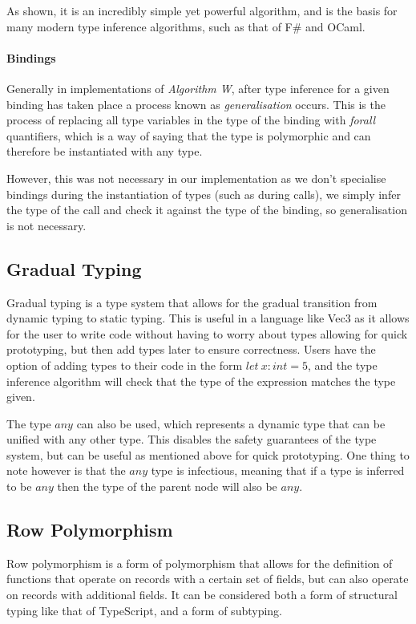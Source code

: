 As shown, it is an incredibly simple yet powerful algorithm, and is the basis for many modern type inference
algorithms, such as that of F\# and OCaml.

\paragraph{Bindings}\label{par:bindings}
Generally in implementations of \textit{Algorithm W}, after type inference for a given binding has taken place a
process known as \textit{generalisation} occurs.
This is the process of replacing all type variables in the type of
the binding with \textit{forall} quantifiers, which is a way of saying that the type is polymorphic and can therefore be
instantiated with any type.

However, this was not necessary in our implementation as we don't specialise bindings during the instantiation of
types (such as during calls), we simply infer the type of the call and check it against the type of the binding, so
generalisation is not necessary.

\subsection{Gradual Typing}\label{subsec:gradual-typing}

Gradual typing is a type system that allows for the gradual transition from dynamic typing to static typing.
This is useful in a language like Vec3 as it allows for the user to write code without having to worry about types
allowing for quick prototyping, but then add types later to ensure correctness.
Users have the option of adding types to their code in the form $let\ x: int = 5$, and the type inference algorithm
will check that the type of the expression matches the type given.

The type $any$ can also be used, which represents a dynamic type that can be unified with any other type.
This disables the safety guarantees of the type system, but can be useful as mentioned above for quick prototyping.
One thing to note however is that the $any$ type is infectious, meaning that if a type is inferred to be $any$ then
the type of the parent node will also be $any$.

\subsection{Row Polymorphism}\label{subsec:row-polymorphism}

Row polymorphism is a form of polymorphism that allows for the definition of functions that operate on records with
a certain set of fields, but can also operate on records with additional fields.
It can be considered both a form of structural typing like that of TypeScript\citep{bierman2014understanding}, and a
form of subtyping.

